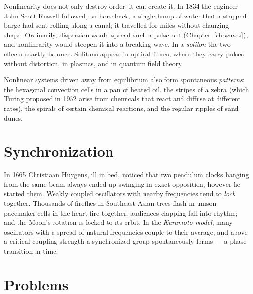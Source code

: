 Nonlinearity does not only destroy order; it can create it. In 1834 the engineer John Scott Russell followed, on horseback, a single hump of water that a stopped barge had sent rolling along a canal; it travelled for miles without changing shape. Ordinarily, dispersion would spread such a pulse out (Chapter~\ref{ch:waves}), and nonlinearity would steepen it into a breaking wave. In a \emph{soliton} the two effects exactly balance. Solitons appear in optical fibres, where they carry pulses without distortion, in plasmas, and in quantum field theory.

Nonlinear systems driven away from equilibrium also form spontaneous \emph{patterns}: the hexagonal convection cells in a pan of heated oil, the stripes of a zebra (which Turing proposed in 1952 arise from chemicals that react and diffuse at different rates), the spirals of certain chemical reactions, and the regular ripples of sand dunes.

\section{Synchronization}

In 1665 Christiaan Huygens, ill in bed, noticed that two pendulum clocks hanging from the same beam always ended up swinging in exact opposition, however he started them. Weakly coupled oscillators with nearby frequencies tend to \emph{lock} together. Thousands of fireflies in Southeast Asian trees flash in unison; pacemaker cells in the heart fire together; audiences clapping fall into rhythm; and the Moon's rotation is locked to its orbit. In the \emph{Kuramoto model}, many oscillators with a spread of natural frequencies couple to their average, and above a critical coupling strength a synchronized group spontaneously forms --- a phase transition in time.

\section{Problems}

